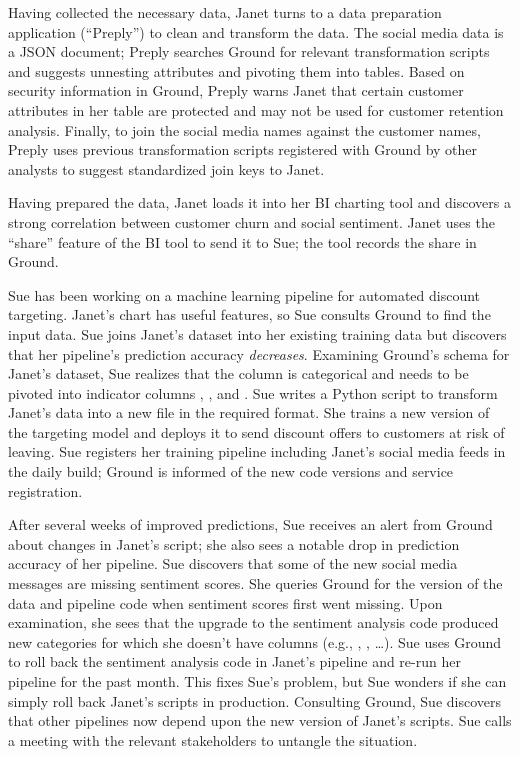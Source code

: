 \documentclass{sig-alternate}
\begin{document}
Having collected the necessary data, Janet turns to a data preparation application (``Preply'') to clean and transform the data. 
The social media data is a JSON document; Preply searches Ground for relevant transformation scripts and suggests unnesting attributes and pivoting them into tables.
Based on security information in Ground, Preply warns Janet that certain customer attributes in her table are protected and may not be used for customer retention analysis.
Finally, to join the social media names against the customer names, Preply uses previous transformation scripts registered with Ground by other analysts to suggest standardized join keys to Janet.


Having prepared the data, Janet loads it into her BI charting tool and discovers a strong correlation between customer churn and social sentiment. 
Janet uses the ``share'' feature of the BI tool to send it to Sue; the tool records the share in Ground.


Sue has been working on a machine learning pipeline for automated discount targeting. Janet's chart has useful features, so Sue consults Ground to find the input data.
Sue joins Janet's dataset into her existing training data but discovers that her pipeline's prediction accuracy \emph{decreases}.  
Examining Ground's schema for Janet's dataset, Sue realizes that the  column is categorical and needs to be pivoted into indicator columns , , and . 
Sue writes a Python script to transform Janet's data into a new file in the required format.
She trains a new version of the targeting model and deploys it to send discount offers to customers at risk of leaving.
Sue registers her training pipeline including Janet's social media feeds in the daily build; Ground is informed of the new code versions and service registration.

After several weeks of improved predictions, Sue receives an alert from Ground about changes in Janet's script; she also sees a notable drop in prediction accuracy of her pipeline. 
Sue discovers that some of the new social media messages are missing sentiment scores.
She queries Ground for the version of the data and pipeline code when sentiment scores first went missing.
Upon examination, she sees that the upgrade to the sentiment analysis code produced new categories for which she doesn't have columns (e.g., , , \ldots).
Sue uses Ground to roll back the sentiment analysis code in Janet's pipeline and re-run her pipeline for the past month.  
This fixes Sue's problem, but Sue wonders if she can simply roll back Janet's scripts in production. 
Consulting Ground, Sue discovers that other pipelines now depend upon the new version of Janet's scripts.
Sue calls a meeting with the relevant stakeholders to untangle the situation.
\end{document}
